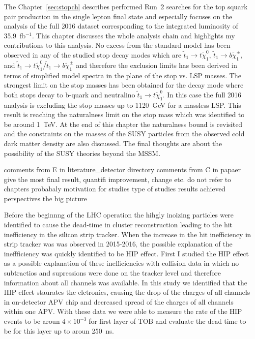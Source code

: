 The Chapter~\ref{sec:stopch} describes performed Run~2 searches for the top squark pair production in the single lepton final state and especially focuses on the analysis of the full 2016 dataset corresponding to the integrated luminosity of 35.9~fb$^{-1}$. This chapter discusses the whole analysis chain and highlights my contributions to this analysis. No excess from the standard model has been observed in any of the studied stop decay modes which are $\tilde{t}_{1} \to t  \tilde{\chi}^{0}_{1} $, $\tilde{t}_{1} \to b  \tilde{\chi}^{\pm}_{1}$, and $ \tilde{t}_{1} \to t  \tilde{\chi}^{0}_{1}/\tilde{t}_{1} \to b  \tilde{\chi}^{\pm}_{1} $ and therefore the exclusion limits has been derived in terms of simplified model spectra in the plane of the stop vs. LSP masses. The strongest limit on the stop masses has been obtained for the decay mode where both stops decay to b-quark and neutralino $\tilde{t}_{1} \to t  \tilde{\chi}^{0}_{1}$. In this case the full 2016 analysis is excluding the stop masses up to 1120~GeV for a massless LSP. This result is reaching the naturalness limit on the stop mass which was identified to be around 1~TeV. At the end of this chapter the naturalness bound is revisited and the constraints on the masses of the SUSY particles from the observed cold dark matter density are also discussed. The final thoughts are about the possibility of the SUSY theories beyond the MSSM.

comments from E in literature_detector directory
comments from C in papaer
give the most final result, quantifi improvement, change etc.
do not refer to chapters probabaly
motivation for studies
type of studies
results achieved
perspectives
the big picture

Before the beginnng of the LHC operation the hihgly inoizing particles were identified to cause the dead-time in cluster reconstruction leading to the hit inefficiency in the silicon strip tracker. When the increase in the hit inefficiency in strip tracker was was observed in 2015-2016, the possible explanation of the ineffficiency was quickly identified to be HIP effect. First I studied the HIP effect as a possible explanation of these inefficiencies with collision data in which no subtractios and supressions were done on the tracker level and therefore information about all channels was available. In this study we identified that the HIP effect staurates the elctronics, causing the drop of the charges of all channels in on-detector APV chip and decreased spread of the charges of all channels within one APV. With these data we were able to measure the rate of the HIP events to be aroun $4 \times 10 ^{-3}$ for first layer of TOB and evaluate the dead time to be for this layer up to aroun 250~ns. 

